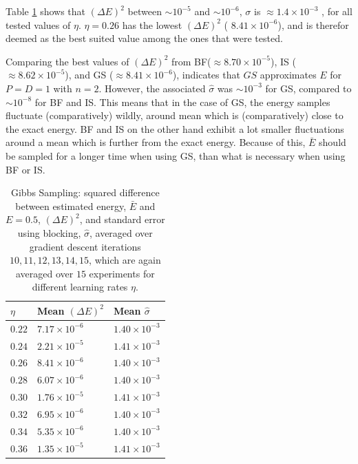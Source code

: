 \documentclass[%
oneside,                 %
final,                   %
10pt]{article}
\begin{document}
Table \ref{table:GD_eta} shows that $(\Delta E)^2$ between $\sim 10^{-5}$ and $\sim 10^{-6}$, $\sigma$ is $\approx 1.4 \times 10^{-3}$ , for all tested values of $\eta$. $\eta=0.26$ has the lowest $(\Delta E)^2$ ( $8.41 \times 10^{-6} $), and is therefor deemed as the best suited value among the ones that were tested. 

Comparing the best values of $(\Delta E)^2$ from BF($\approx 8.70\times 10^{-5 }$), IS ($\approx 8.62\times 10^{-5 }$), and GS ($\approx 8.41\times 10^{ -6 }$), indicates that $GS$ approximates $E$ for $P=D=1$ with $n=2$. However, the associated $\hat \sigma$ was $\sim 10^{-3}$ for GS, compared to $\sim 10^{-8}$ for BF and IS. This means that in the case of GS, the energy samples fluctuate (comparatively) wildly, around mean which is  (comparatively) close to the exact energy. BF and IS on the other hand exhibit a lot smaller fluctuations around a mean which is further from the exact energy.  Because of this, $\bar E$ should be sampled for a longer time when using GS, than what is necessary when using BF or IS. 

\begin{table}[h!]
\begin{center}
\begin{tabular}{lll}
\hline
 $\eta$ & Mean $(\Delta E)^2$ & Mean $\hat \sigma$ \\
\hline
$ 0.22 $ &  $ 7.17\times 10^{ -6 } $ & $ 1.40\times 10^{ -3 } $  \\
$ 0.24 $ &  $ 2.21\times 10^{ -5 } $ & $ 1.41\times 10^{ -3 } $  \\
$ 0.26 $ &  $ 8.41\times 10^{ -6 } $ & $ 1.40\times 10^{ -3 } $  \\
$ 0.28 $ &  $ 6.07\times 10^{ -6 } $ & $ 1.40\times 10^{ -3 } $  \\
$ 0.30 $ &  $ 1.76\times 10^{ -5 } $ & $ 1.41\times 10^{ -3 } $  \\
$ 0.32 $ &  $ 6.95\times 10^{ -6 } $ & $ 1.40\times 10^{ -3 } $  \\
$ 0.34 $ &  $ 5.35\times 10^{ -6 } $ & $ 1.40\times 10^{ -3 } $  \\
$ 0.36 $ &  $ 1.35\times 10^{ -5 } $ & $ 1.41\times 10^{ -3 } $  \\

\hline
\end{tabular}
\end{center}
\caption{Gibbs Sampling: squared difference between estimated energy, $\bar E$ and $E=0.5$, $(\Delta E)^2$, and standard error using blocking, $\hat \sigma$, averaged over gradient descent iterations $10,11,12,13,14,15$, which are again averaged over $15$ experiments for different learning rates $\eta$.}
\label{table:GD_eta}
\end{table}
\end{document}
